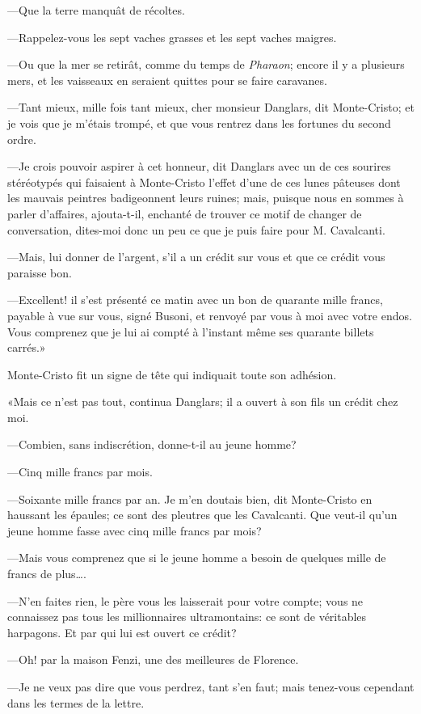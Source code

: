 —Que la terre manquât de récoltes. 

—Rappelez-vous les sept vaches grasses et les sept vaches maigres. 

—Ou que la mer se retirât, comme du temps de \textit{Pharaon}; encore il y a plusieurs mers, et les vaisseaux en seraient quittes pour se faire caravanes.  

—Tant mieux, mille fois tant mieux, cher monsieur Danglars, dit Monte-Cristo; et je vois que je m'étais trompé, et que vous rentrez dans les fortunes du second ordre. 

—Je crois pouvoir aspirer à cet honneur, dit Danglars avec un de ces sourires stéréotypés qui faisaient à Monte-Cristo l'effet d'une de ces lunes pâteuses dont les mauvais peintres badigeonnent leurs ruines; mais, puisque nous en sommes à parler d'affaires, ajouta-t-il, enchanté de trouver ce motif de changer de conversation, dites-moi donc un peu ce que je puis faire pour M. Cavalcanti. 

—Mais, lui donner de l'argent, s'il a un crédit sur vous et que ce crédit vous paraisse bon. 

—Excellent! il s'est présenté ce matin avec un bon de quarante mille francs, payable à vue sur vous, signé Busoni, et renvoyé par vous à moi avec votre endos. Vous comprenez que je lui ai compté à l'instant même ses quarante billets carrés.» 

Monte-Cristo fit un signe de tête qui indiquait toute son adhésion. 

«Mais ce n'est pas tout, continua Danglars; il a ouvert à son fils un crédit chez moi. 

—Combien, sans indiscrétion, donne-t-il au jeune homme? 

—Cinq mille francs par mois. 

—Soixante mille francs par an. Je m'en doutais bien, dit Monte-Cristo en haussant les épaules; ce sont des pleutres que les Cavalcanti. Que veut-il qu'un jeune homme fasse avec cinq mille francs par mois? 

—Mais vous comprenez que si le jeune homme a besoin de quelques mille de francs de plus\dots. 

—N'en faites rien, le père vous les laisserait pour votre compte; vous ne connaissez pas tous les millionnaires ultramontains: ce sont de véritables harpagons. Et par qui lui est ouvert ce crédit? 

—Oh! par la maison Fenzi, une des meilleures de Florence. 

—Je ne veux pas dire que vous perdrez, tant s'en faut; mais tenez-vous cependant dans les termes de la lettre. 

